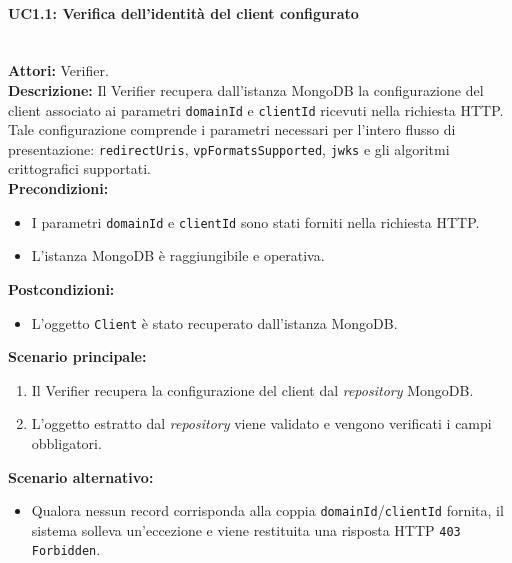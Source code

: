 \paragraph{\large\bfseries UC1.1: Verifica dell'identità del client configurato}
\label{uc:verifier:uc1.1}
\mbox{}\\
\noindent\textbf{Attori:} Verifier.
\\
\noindent\textbf{Descrizione:} Il Verifier recupera dall'istanza MongoDB la configurazione del client associato ai parametri \texttt{domainId} e \texttt{clientId} ricevuti nella richiesta HTTP. Tale configurazione comprende i parametri necessari per l'intero flusso di presentazione: \texttt{redirectUris}, \texttt{vpFormatsSupported}, \texttt{jwks} e gli algoritmi crittografici supportati.
\\
\noindent\textbf{Precondizioni:}
\begin{itemize}
    \item I parametri \texttt{domainId} e \texttt{clientId} sono stati forniti nella richiesta HTTP.
    \item L'istanza MongoDB è raggiungibile e operativa.
\end{itemize}
\noindent\textbf{Postcondizioni:}
\begin{itemize}
    \item L'oggetto \texttt{Client} è stato recuperato dall'istanza MongoDB.
\end{itemize}

\noindent\textbf{Scenario principale:}
\begin{enumerate}
    \item Il Verifier recupera la configurazione del client dal \textit{repository} MongoDB.
    \item L'oggetto estratto dal \textit{repository} viene validato e vengono verificati i campi obbligatori.
\end{enumerate}

\noindent\textbf{Scenario alternativo:}
\begin{itemize}
    \item Qualora nessun record corrisponda alla coppia \texttt{domainId}/\texttt{clientId} fornita, il sistema solleva un'eccezione e viene restituita una risposta HTTP \texttt{403 Forbidden}.
\end{itemize}

